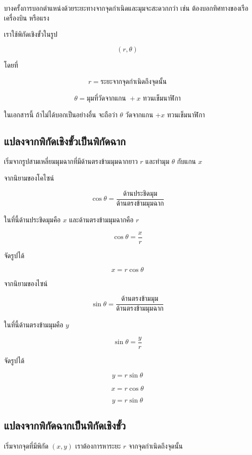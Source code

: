 \documentclass[12pt,a4paper]{report}
\begin{document}
บางครั้งการบอกตำแหน่งด้วยระยะทางจากจุดกำเนิดและมุมจะสะดวกกว่า เช่น ต้องบอกทิศทางของเรือ เครื่องบิน หรือแรง

เราใช้พิกัดเชิงขั้วในรูป

\[
(r,\theta)
\]

โดยที่

\[
r = \text{ระยะจากจุดกำเนิดถึงจุดนั้น}
\]

\[
\theta = \text{มุมที่วัดจากแกน } +x \text{ ทวนเข็มนาฬิกา}
\]

\begin{tcolorbox}[title=ข้อควรจำ]
ในเอกสารนี้ ถ้าไม่ได้บอกเป็นอย่างอื่น จะถือว่า $\theta$ วัดจากแกน $+x$ ทวนเข็มนาฬิกา
\end{tcolorbox}

\subsection{แปลงจากพิกัดเชิงขั้วเป็นพิกัดฉาก}

เริ่มจากรูปสามเหลี่ยมมุมฉากที่มีด้านตรงข้ามมุมฉากยาว $r$ และทำมุม $\theta$ กับแกน $x$

จากนิยามของโคไซน์

\[
\cos\theta=\frac{\text{ด้านประชิดมุม}}{\text{ด้านตรงข้ามมุมฉาก}}
\]

ในที่นี้ด้านประชิดมุมคือ $x$ และด้านตรงข้ามมุมฉากคือ $r$

\[
\cos\theta=\frac{x}{r}
\]

จัดรูปได้

\[
x=r\cos\theta
\]

จากนิยามของไซน์

\[
\sin\theta=\frac{\text{ด้านตรงข้ามมุม}}{\text{ด้านตรงข้ามมุมฉาก}}
\]

ในที่นี้ด้านตรงข้ามมุมคือ $y$

\[
\sin\theta=\frac{y}{r}
\]

จัดรูปได้

\[
y=r\sin\theta
\]

\begin{tcolorbox}[title={สูตรแปลงจาก $(r,\theta)$ ไปเป็น $(x,y)$}]
\[
x=r\cos\theta
\]

\[
y=r\sin\theta
\]
\end{tcolorbox}

\subsection{แปลงจากพิกัดฉากเป็นพิกัดเชิงขั้ว}

เริ่มจากจุดที่มีพิกัด $(x,y)$ เราต้องการหาระยะ $r$ จากจุดกำเนิดถึงจุดนั้น
\end{document}
